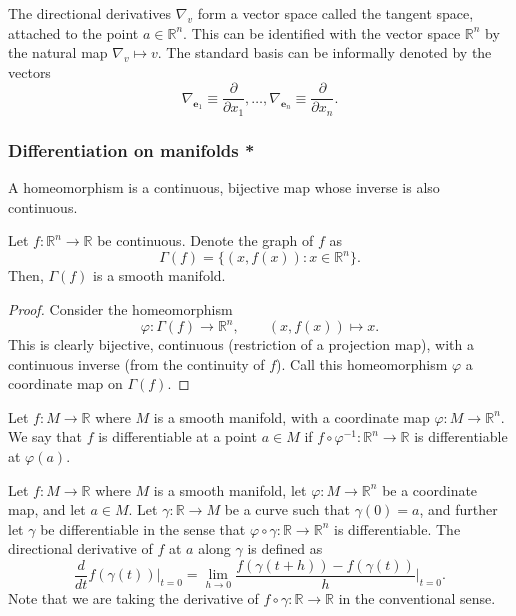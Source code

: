 \documentclass[11pt]{article}
\newcommand{\R}{\mathbb{R}}
\renewcommand{\vec}[1]{\boldsymbol{#1}}
\newcommand{\ve}{\vec{e}}
\newcommand{\dd}[2]{\frac{d #1}{d #2}}
\newcommand{\pp}[2]{\frac{\partial #1}{\partial #2}}
\newcommand{\grad}{\nabla}
\theoremstyle{definition}
\theoremstyle{remark}
\numberwithin{equation}{section}
\begin{document}
    \begin{lemma}
        The directional derivatives $\grad_v$ form a vector space called the tangent
        space, attached to the point $a \in \R^n$. This can be identified with the
        vector space $\R^n$ by the natural map $\grad_v \mapsto v$. The standard
        basis can be informally denoted by the vectors \[
            \grad_{\ve_1} \equiv \pp{}{x_1}, \dots, \grad_{\ve_n} \equiv \pp{}{x_n}.
        \] 
    \end{lemma}

    \subsubsection{Differentiation on manifolds *}

    \begin{definition}
        A homeomorphism is a continuous, bijective map whose inverse is also continuous.
    \end{definition}

    \begin{lemma}
        Let $f\colon \R^n \to \R$ be continuous. Denote the graph of $f$ as \[
            \Gamma(f) = \{(x, f(x)): x \in \R^n\}.
        \] Then, $\Gamma(f)$ is a smooth manifold.
    \end{lemma}
    \begin{proof}
        Consider the homeomorphism \[
            \varphi\colon \Gamma(f) \to \R^n, \qquad (x, f(x)) \mapsto x.
        \] This is clearly bijective, continuous (restriction of a projection map),
        with a continuous inverse (from the continuity of $f$). Call this
        homeomorphism $\varphi$ a coordinate map on $\Gamma(f)$.
    \end{proof}

    \begin{definition}
        Let $f\colon M \to \R$ where $M$ is a smooth manifold, with a coordinate map
        $\varphi\colon M \to \R^n$. We say that $f$ is differentiable at a point $a
        \in M$ if $f\circ \varphi^{-1}\colon \R^n \to \R$ is differentiable at
        $\varphi(a)$.
    \end{definition}

    \begin{definition}
        Let $f\colon M \to \R$ where $M$ is a smooth manifold, let $\varphi\colon M
        \to \R^n$ be a coordinate map, and let $a \in M$. Let $\gamma\colon \R \to M$
        be a curve such that $\gamma(0) = a$, and further let $\gamma$ be
        differentiable in the sense that $\varphi\circ \gamma\colon \R \to \R^n$ is
        differentiable. The directional derivative of $f$ at $a$ along $\gamma$ is
        defined as \[
            \dd{}{t} f(\gamma(t))\Big|_{t = 0} = \lim_{h \to 0} \frac{f(\gamma(t +
            h)) - f(\gamma(t))}{h}\Big|_{t = 0}.
        \] Note that we are taking the derivative of $f\circ \gamma\colon \R \to \R$
        in the conventional sense.
    \end{definition}
\end{document}
